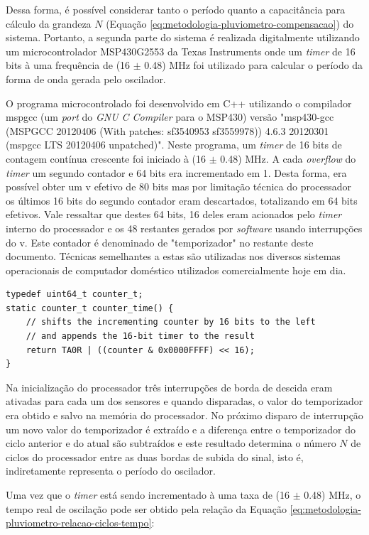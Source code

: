 \documentclass[a4paper]{instrumentacao}
\begin{document}
Dessa forma, é possível considerar tanto o período quanto a capacitância para cálculo da grandeza $N$ (Equação \ref{eq:metodologia-pluviometro-compensacao}) do sistema. Portanto, a segunda parte do sistema é realizada digitalmente utilizando um microcontrolador MSP430G2553 da Texas Instruments onde um \textit{timer} de 16 bits à uma frequência de (16 $\pm$ 0.48) MHz foi utilizado para calcular o período da forma de onda gerada pelo oscilador.

O programa microcontrolado foi desenvolvido em C++ utilizando o compilador mspgcc (um \textit{port} do \textit{GNU C Compiler} para o MSP430) versão "msp430-gcc (MSPGCC 20120406 (With patches: sf3540953 sf3559978)) 4.6.3 20120301 (mspgcc LTS 20120406 unpatched)". Neste programa, um \textit{timer} de 16 bits de contagem contínua crescente foi iniciado à (16 $\pm$ 0.48) MHz. A cada \textit{overflow} do \textit{timer} um segundo contador e 64 bits era incrementado em 1. Desta forma, era possível obter um v efetivo de 80 bits mas por limitação técnica do processador os últimos 16 bits do segundo contador eram descartados, totalizando em 64 bits efetivos. Vale ressaltar que destes 64 bits, 16 deles eram acionados pelo \textit{timer} interno do processador e os 48 restantes gerados por \textit{software} usando interrupções do v. Este contador é denominado de "temporizador" no restante deste documento. Técnicas semelhantes a estas são utilizadas nos diversos sistemas operacionais de computador doméstico utilizados comercialmente hoje em dia.

\begin{lstlisting}[caption=Rotina de extração do timer do temporizador]
typedef uint64_t counter_t;
static counter_t counter_time() {
    // shifts the incrementing counter by 16 bits to the left
    // and appends the 16-bit timer to the result
    return TA0R | ((counter & 0x0000FFFF) << 16);
}
\end{lstlisting}

Na inicialização do processador três interrupções de borda de descida eram ativadas para cada um dos sensores e quando disparadas, o valor do temporizador era obtido e salvo na memória do processador. No próximo disparo de interrupção um novo valor do temporizador é extraído e a diferença entre o temporizador do ciclo anterior e do atual são subtraídos e este resultado determina o número $N$ de ciclos do processador entre as duas bordas de subida do sinal, isto é, indiretamente representa o período do oscilador.

Uma vez que o \textit{timer} está sendo incrementado à uma taxa de (16 $\pm$ 0.48) MHz, o tempo real de oscilação pode ser obtido pela relação da Equação \ref{eq:metodologia-pluviometro-relacao-ciclos-tempo}:
\end{document}
